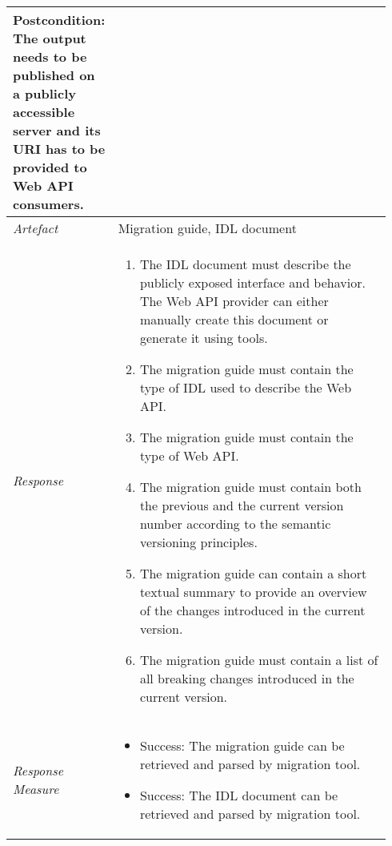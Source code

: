\begin{center}
\begin{longtable}{ p{0.22\linewidth} p{0.72\linewidth} }
    	\textbf{Postcondition:} The output needs to be published on a publicly accessible server and its URI has to be provided to Web API consumers.
    	\\
    \hline
    	\textit{Artefact} & Migration guide, IDL document\\
    \hline
    \textit{Response} &
    \vspace{-5.1mm}
    \begin{enumerate}[itemindent=-9pt, leftmargin=14pt, itemsep=0pt, align=left]
    	\item The IDL document must describe the publicly exposed interface and behavior. The Web API provider can either manually create this document or generate it using tools.
    	\item The migration guide must contain the type of IDL used to describe the Web API.
    	\item The migration guide must contain the type of Web API.
    	\item The migration guide must contain both the previous and the current version number according to the semantic versioning principles.
    	\item The migration guide can contain a short textual summary to provide an overview of the changes introduced in the current version.
    	\item The migration guide must contain a list of all breaking changes introduced in the current version. 
    \end{enumerate} \\ [-5mm]
    \hline
    \textit{Response Measure} &
    \vspace{-8.5mm}
    \begin{itemize}[itemindent=-9pt, leftmargin=14pt, itemsep=0pt, align=left]
       	\item Success: The migration guide can be retrieved and parsed by migration tool.
       	\item Success: The IDL document can be retrieved and parsed by migration tool.
        \vspace{-5mm}
    \end{itemize}\\
    \hline
    \end{longtable}
\end{center}